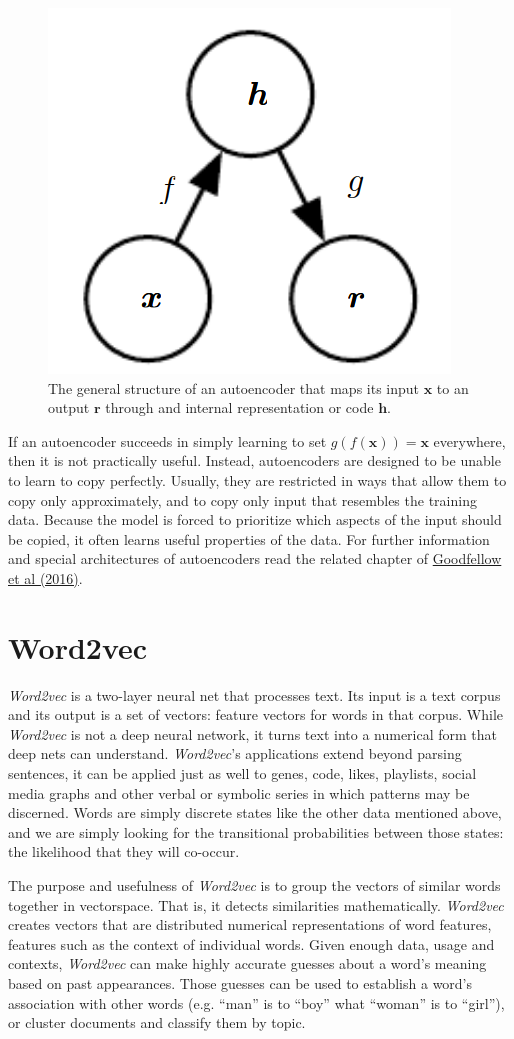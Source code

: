 \documentclass[12pt]{article}
\theoremstyle{plain}
\begin{document}
\begin{figure}[h!]
	\begin{center}
	\includegraphics[width=0.3\linewidth]{media/autoencoder.png}
	\caption{The general structure of an autoencoder that maps its input $\mathbf{x}$ to an output $\mathbf{r}$ through and internal representation or code $\mathbf{h}$.}
	\label{autoencoder}
	\end{center}
\end{figure}


If an autoencoder succeeds in simply learning to set $g(f(\mathbf{x})) = \mathbf{x}$ everywhere, then it is not practically useful. Instead, autoencoders are designed to be unable to learn to copy perfectly. Usually, they are restricted in ways that allow them to copy only approximately, and to copy only input that resembles the training data. Because the model is forced to prioritize which aspects of the input should be copied, it often learns useful properties of the data. For further information and special architectures of autoencoders read the related chapter of \hyperlink{Deeplea_Goodfellow}{Goodfellow et al (2016)}.

\section{Word2vec}

\textit{Word2vec} is a two-layer neural net that processes text. Its input is a text corpus and its output is a set of vectors: feature vectors for words in that corpus. While \textit{Word2vec} is not a deep neural network, it turns text into a numerical form that deep nets can understand. \textit{Word2vec}'s applications extend beyond parsing sentences, it can be applied just as well to genes, code, likes, playlists, social media graphs and other verbal or symbolic series in which patterns may be discerned. Words are simply discrete states like the other data mentioned above, and we are simply looking for the transitional probabilities between those states: the likelihood that they will co-occur.

The purpose and usefulness of \textit{Word2vec} is to group the vectors of similar words together in vectorspace. That is, it detects similarities mathematically. \textit{Word2vec} creates vectors that are distributed numerical representations of word features, features such as the context of individual words. Given enough data, usage and contexts, \textit{Word2vec} can make highly accurate guesses about a word’s meaning based on past appearances. Those guesses can be used to establish a word’s association with other words (e.g. “man” is to “boy” what “woman” is to “girl”), or cluster documents and classify them by topic.
\end{document}
